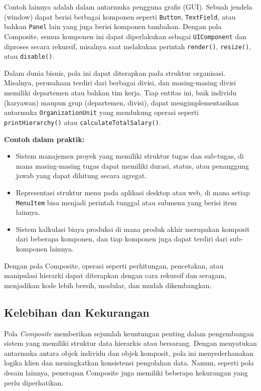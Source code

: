 Contoh lainnya adalah dalam antarmuka pengguna grafis (GUI). Sebuah jendela (window) dapat berisi berbagai komponen seperti \texttt{Button}, \texttt{TextField}, atau bahkan \texttt{Panel} lain yang juga berisi komponen tambahan. Dengan pola Composite, semua komponen ini dapat diperlakukan sebagai \texttt{UIComponent} dan diproses secara rekursif, misalnya saat melakukan perintah \texttt{render()}, \texttt{resize()}, atau \texttt{disable()}.

Dalam dunia bisnis, pola ini dapat diterapkan pada struktur organisasi. Misalnya, perusahaan terdiri dari berbagai divisi, dan masing-masing divisi memiliki departemen atau bahkan tim kerja. Tiap entitas ini, baik individu (karyawan) maupun grup (departemen, divisi), dapat mengimplementasikan antarmuka \texttt{OrganizationUnit} yang mendukung operasi seperti \texttt{printHierarchy()} atau \texttt{calculateTotalSalary()}.

\textbf{Contoh dalam praktik:}
\begin{itemize}
	\item Sistem manajemen proyek yang memiliki struktur tugas dan sub-tugas, di mana masing-masing tugas dapat memiliki durasi, status, atau penanggung jawab yang dapat dihitung secara agregat.
	\item Representasi struktur menu pada aplikasi desktop atau web, di mana setiap \texttt{MenuItem} bisa menjadi perintah tunggal atau submenu yang berisi item lainnya.
	\item Sistem kalkulasi biaya produksi di mana produk akhir merupakan komposit dari beberapa komponen, dan tiap komponen juga dapat terdiri dari sub-komponen lainnya.
\end{itemize}

Dengan pola Composite, operasi seperti perhitungan, pencetakan, atau manipulasi hierarki dapat diterapkan dengan cara rekursif dan seragam, menjadikan kode lebih bersih, modular, dan mudah dikembangkan.

\subsection{Kelebihan dan Kekurangan}

Pola \textit{Composite} memberikan sejumlah keuntungan penting dalam pengembangan sistem yang memiliki struktur data hierarkis atau bersarang. Dengan menyatukan antarmuka antara objek individu dan objek komposit, pola ini menyederhanakan logika klien dan meningkatkan konsistensi pengolahan data. Namun, seperti pola desain lainnya, penerapan Composite juga memiliki beberapa kekurangan yang perlu diperhatikan.


